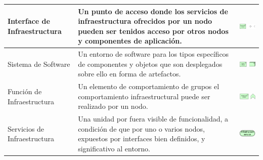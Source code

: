\begin{table}[H]
\begin{tabular}{| m{4cm} | m{4cm} | m{4cm} | }
		\hline
		\centering\vspace{1.52mm}Interface de Infraestructura & \vspace{1.52mm}Un punto de acceso donde los servicios de infraestructura ofrecidos por un nodo pueden ser tenidos acceso por otros nodos y componentes de aplicación. & \vspace{1.52mm}\includegraphics[width=40mm]{arquitectura/imagenes/35} \\
		\hline
		\centering\vspace{1.52mm}Sistema de Software & \vspace{1.52mm}Un entorno de software para los tipos específicos de componentes y objetos que son desplegados sobre ello en forma de artefactos.& \vspace{1.52mm}\includegraphics[width=40mm]{arquitectura/imagenes/36} \\
		\hline
		\centering\vspace{1.52mm}Función de Infraestructura & \vspace{1.52mm}Un elemento de comportamiento de grupos el comportamiento infraestructural puede ser realizado por un nodo.& \vspace{1.52mm}\includegraphics[width=40mm]{arquitectura/imagenes/37} \\
		\hline
		\centering\vspace{1.52mm}Servicios de Infraestructura & \vspace{1.52mm}Una unidad por fuera visible de funcionalidad, a condición de que por uno o varios nodos, expuestos por interfaces bien definidos, y significativo al entorno.& \vspace{1.52mm}\includegraphics[width=20mm]{arquitectura/imagenes/38} \\
		\hline
	\end{tabular}
\end{table}

